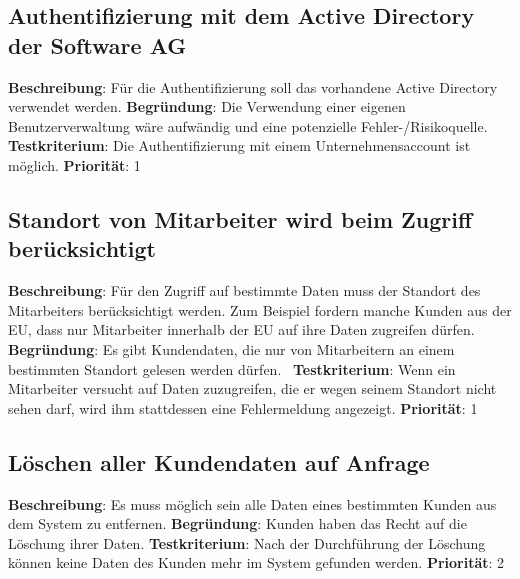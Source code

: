 \subsection{Authentifizierung mit dem Active Directory der Software AG} \label{sec:anforderungsspezifikation:SAG_AD}
\textbf{Beschreibung}: Für die Authentifizierung soll das vorhandene Active Directory verwendet werden.
\newline \textbf{Begründung}: Die Verwendung einer eigenen Benutzerverwaltung wäre aufwändig und eine potenzielle Fehler-/Risikoquelle.
\newline \textbf{Testkriterium}: Die Authentifizierung mit einem Unternehmensaccount ist möglich.
\newline \textbf{Priorität}: 1

\subsection{Standort von Mitarbeiter wird beim Zugriff berücksichtigt} \label{sec:anforderungsspezifikation:zugriffStandort}
\textbf{Beschreibung}: Für den Zugriff auf bestimmte Daten muss der Standort des Mitarbeiters berücksichtigt werden. Zum Beispiel fordern manche Kunden aus der EU, dass nur Mitarbeiter innerhalb der EU auf ihre Daten zugreifen dürfen.
\newline \textbf{Begründung}: Es gibt Kundendaten, die nur von Mitarbeitern an einem bestimmten Standort gelesen werden dürfen. 
\newline \textbf{Testkriterium}: Wenn ein Mitarbeiter versucht auf Daten zuzugreifen, die er wegen seinem Standort nicht sehen darf, wird ihm stattdessen eine Fehlermeldung angezeigt.
\newline \textbf{Priorität}: 1

\subsection{Löschen aller Kundendaten auf Anfrage} \label{sec:anforderungsspezifikation:löschenKundendaten}
\textbf{Beschreibung}: Es muss möglich sein alle Daten eines bestimmten Kunden aus dem System zu entfernen.
\newline \textbf{Begründung}: Kunden haben das Recht auf die Löschung ihrer Daten.
\newline \textbf{Testkriterium}: Nach der Durchführung der Löschung können keine Daten des Kunden mehr im System gefunden werden.
\newline \textbf{Priorität}: 2

